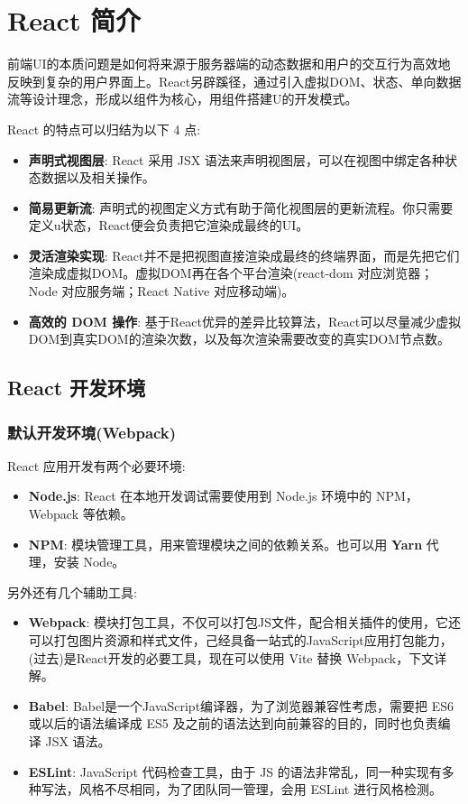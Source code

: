 \section{React 简介}

前端UI的本质问题是如何将来源于服务器端的动态数据和用户的交互行为高效地反映到复杂的用户界面上。React另辟蹊径，通过引入虚拟DOM、状态、单向数据流等设计理念，形成以组件为核心，用组件搭建U的开发模式。

React 的特点可以归结为以下 4 点:
\begin{itemize}
    \item \textbf{声明式视图层}: React 采用 JSX 语法来声明视图层，可以在视图中绑定各种状态数据以及相关操作。
    \item \textbf{简易更新流}: 声明式的视图定义方式有助于简化视图层的更新流程。你只需要定义u状态，React便会负责把它渲染成最终的UI。
    \item \textbf{灵活渲染实现}: React并不是把视图直接渲染成最终的终端界面，而是先把它们渲染成虚拟DOM。虚拟DOM再在各个平台渲染(react-dom 对应浏览器；Node 对应服务端；React Native 对应移动端)。
    \item \textbf{高效的 DOM 操作}: 基于React优异的差异比较算法，React可以尽量减少虚拟DOM到真实DOM的渲染次数，以及每次渲染需要改变的真实DOM节点数。
\end{itemize}

\subsection{React 开发环境}

\subsubsection{默认开发环境(Webpack)}

React 应用开发有两个必要环境:
\begin{itemize}
    \item \textbf{Node.js}: React 在本地开发调试需要使用到 Node.js 环境中的 NPM，Webpack 等依赖。
    \item \textbf{NPM}: 模块管理工具，用来管理模块之间的依赖关系。也可以用 \textbf{Yarn} 代理，安装 Node。
\end{itemize}

另外还有几个辅助工具:
\begin{itemize}
    \item \textbf{Webpack}: 模块打包工具，不仅可以打包JS文件，配合相关插件的使用，它还可以打包图片资源和样式文件，己经具备一站式的JavaScript应用打包能力，(过去)是React开发的必要工具，现在可以使用 Vite 替换 Webpack，下文详解。
    \item \textbf{Babel}: Babel是一个JavaScript编译器，为了浏览器兼容性考虑，需要把 ES6 或以后的语法编译成 ES5 及之前的语法达到向前兼容的目的，同时也负责编译 JSX 语法。
    \item \textbf{ESLint}: JavaScript 代码检查工具，由于 JS 的语法非常乱，同一种实现有多种写法，风格不尽相同，为了团队同一管理，会用 ESLint 进行风格检测。
\end{itemize}

